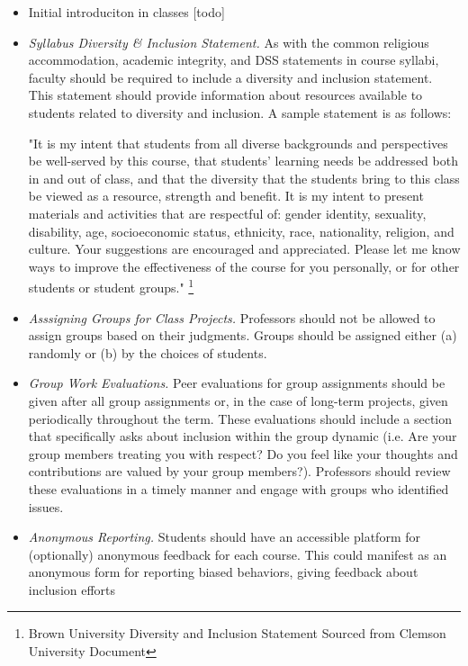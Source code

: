 \documentclass{article}
\begin{document}
\begin{itemize}
\item 
Initial introduciton in classes [todo]
\item
\emph{Syllabus Diversity \& Inclusion Statement.} 
As with the common religious accommodation, academic integrity, and DSS statements in course syllabi, 
faculty should be required to include a diversity and inclusion statement. 
This statement should provide information about resources available to students related to diversity and inclusion.
A sample statement is as follows: 
\begin{center}
"It is my intent that students from all diverse backgrounds and perspectives be well-served by this course, 
that students' learning needs be addressed both in and out of class, and that the diversity that the students 
bring to this class be viewed as a resource, strength and benefit. It is my intent to present materials and 
activities that are respectful of: gender identity, sexuality, disability, age, socioeconomic status, ethnicity, 
race, nationality, religion, and culture. Your suggestions are encouraged and appreciated. Please let me know ways to 
improve the effectiveness of the course for you personally, or for other students or student groups."
\footnote[1]{
Brown University Diversity and Inclusion Statement Sourced from Clemson University Document}
\end{center}
\item
\emph{Asssigning Groups for Class Projects.} 
Professors should not be allowed to assign groups based on their judgments.
Groups should be assigned either (a) randomly or (b) by the choices of students.
\item
\emph{Group Work Evaluations.} Peer evaluations for group assignments should be given after all group assignments 
or, in the case of long-term projects, given periodically throughout the term. These evaluations should include a 
section that specifically asks about inclusion within the group dynamic (i.e. Are your group members treating 
you with respect? Do you feel like your thoughts and contributions are valued by your group members?). Professors 
should review these evaluations in a timely manner and engage with groups who identified issues. 
\item
\emph{Anonymous Reporting.} 
Students should have an accessible platform for (optionally) anonymous feedback for each course. 
This could manifest as an anonymous form for reporting biased behaviors, giving feedback about inclusion efforts 

\end{itemize}
\end{document}
